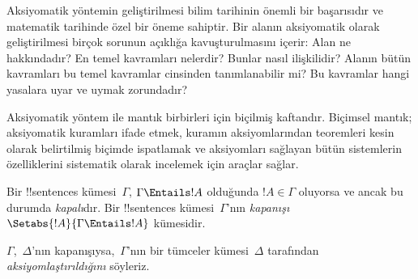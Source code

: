 


\begin{explain}
Aksiyomatik yöntemin geliştirilmesi bilim tarihinin önemli bir
başarısıdır ve matematik tarihinde özel bir öneme sahiptir. Bir alanın
aksiyomatik olarak geliştirilmesi birçok sorunun açıklığa
kavuşturulmasını içerir: Alan ne hakkındadır? En temel kavramları
nelerdir? Bunlar nasıl ilişkilidir? Alanın bütün kavramları bu temel
kavramlar cinsinden tanımlanabilir mi? Bu kavramlar hangi yasalara uyar
ve uymak zorundadır?

Aksiyomatik yöntem ile mantık birbirleri için biçilmiş kaftandır.
Biçimsel mantık; aksiyomatik kuramları ifade etmek, kuramın
aksiyomlarından teoremleri kesin olarak belirtilmiş biçimde ispatlamak
ve aksiyomları sağlayan bütün sistemlerin özelliklerini sistematik
olarak incelemek için araçlar sağlar.
\end{explain}

\begin{defn}
Bir !!{sentence}s kümesi~$\Gamma$, $\Gamma\Entails !A$ olduğunda
$!A\in\Gamma$ oluyorsa ve ancak bu durumda \emph{kapalı}dır. Bir
!!{sentence}s kümesi~$\Gamma$'nın \emph{kapanışı}
$\Setabs{!A}{\Gamma\Entails !A}$ kümesidir.

$\Gamma$,~$\Delta$'nın kapanışıysa,~$\Gamma$'nın bir tümceler
kümesi~$\Delta$ tarafından \emph{aksiyomlaştırıldığını} söyleriz.
\end{defn}

